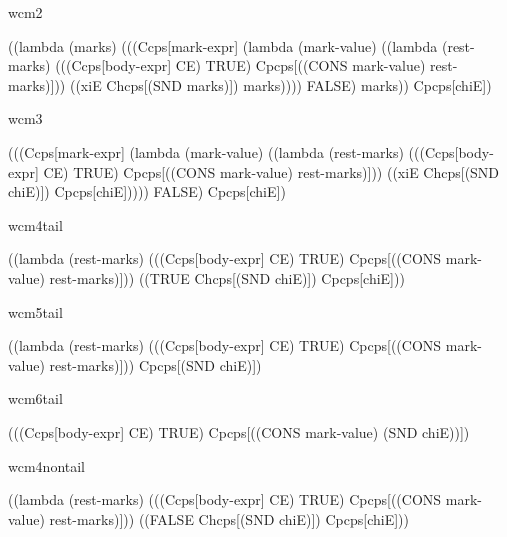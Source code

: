 \noindent
wcm2

\begin{schemeblock}
\begin{schemedisplay}
((lambda (marks)
   (((Ccps[mark-expr]
          (lambda (mark-value) 
            ((lambda (rest-marks) 
               (((Ccps[body-expr] CE) TRUE) Cpcps[((CONS mark-value) rest-marks)]))
             ((xiE Chcps[(SND marks)]) marks))))
     FALSE) marks))
 Cpcps[chiE])
\end{schemedisplay}
\end{schemeblock}

\noindent
wcm3

\begin{schemeblock}
\begin{schemedisplay}
(((Ccps[mark-expr]
       (lambda (mark-value) 
         ((lambda (rest-marks) 
            (((Ccps[body-expr] CE) TRUE) Cpcps[((CONS mark-value) rest-marks)]))
          ((xiE Chcps[(SND chiE)]) Cpcps[chiE]))))
  FALSE) Cpcps[chiE])
\end{schemedisplay}
\end{schemeblock}

\noindent
wcm4tail

\begin{schemeblock}
\begin{schemedisplay}
((lambda (rest-marks) 
   (((Ccps[body-expr] CE) TRUE) Cpcps[((CONS mark-value) rest-marks)]))
 ((TRUE Chcps[(SND chiE)]) Cpcps[chiE]))
\end{schemedisplay}
\end{schemeblock}

\noindent
wcm5tail

\begin{schemeblock}
\begin{schemedisplay}
((lambda (rest-marks) 
   (((Ccps[body-expr] CE) TRUE) Cpcps[((CONS mark-value) rest-marks)]))
 Cpcps[(SND chiE)])
\end{schemedisplay}
\end{schemeblock}

\noindent
wcm6tail

\begin{schemeblock}
\begin{schemedisplay}
(((Ccps[body-expr] CE) TRUE) Cpcps[((CONS mark-value) (SND chiE))])
\end{schemedisplay}
\end{schemeblock}

\noindent
wcm4nontail

\begin{schemeblock}
\begin{schemedisplay}
((lambda (rest-marks) 
   (((Ccps[body-expr] CE) TRUE) Cpcps[((CONS mark-value) rest-marks)]))
 ((FALSE Chcps[(SND chiE)]) Cpcps[chiE]))
\end{schemedisplay}
\end{schemeblock}

